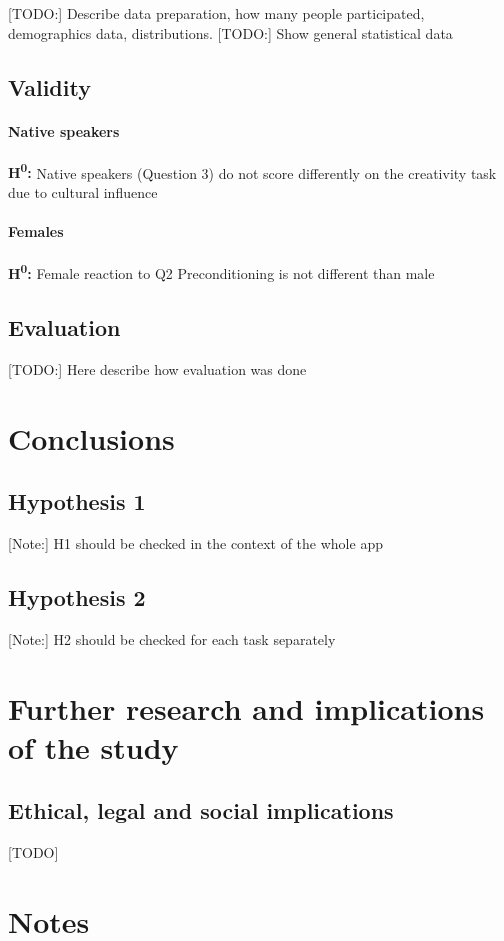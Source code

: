 	[TODO:] Describe data preparation, how many people participated, demographics data, distributions.
	[TODO:] Show general statistical data
	
	\subsection{Validity} \label{sec:data-validity}
	
	\paragraph{Native speakers} 
	\textbf{H\textsuperscript{0}:}  Native speakers (Question 3) do not score differently on the creativity task due to cultural influence 
	
	\paragraph{Females} 
	\textbf{H\textsuperscript{0}:} Female reaction to Q2 Preconditioning is not different than male
	
	\subsection{Evaluation}
	
	[TODO:] Here describe how evaluation was done
	
\section{Conclusions}

	\subsection{Hypothesis 1}
	
	[Note:] H1 should be checked in the context of the whole app
	
	\subsection{Hypothesis 2}
	
	[Note:] H2 should be checked for each task separately

\section{Further research and implications of the study} \label{sec:further-research}

\subsection{Ethical, legal and social implications}

[TODO]

\section{Notes}




